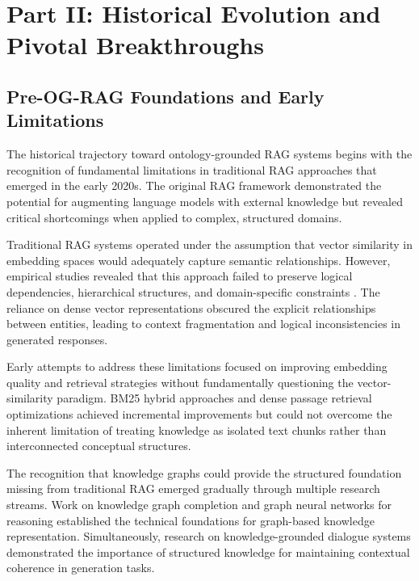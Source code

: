 \section{Part II: Historical Evolution and Pivotal Breakthroughs}

\subsection{Pre-OG-RAG Foundations and Early Limitations}

The historical trajectory toward ontology-grounded RAG systems begins with the recognition of fundamental limitations in traditional RAG approaches that emerged in the early 2020s. The original RAG framework \cite{lewis2020retrieval} demonstrated the potential for augmenting language models with external knowledge but revealed critical shortcomings when applied to complex, structured domains.

Traditional RAG systems operated under the assumption that vector similarity in embedding spaces would adequately capture semantic relationships. However, empirical studies revealed that this approach failed to preserve logical dependencies, hierarchical structures, and domain-specific constraints \cite{petroni2021kilt}. The reliance on dense vector representations obscured the explicit relationships between entities, leading to context fragmentation and logical inconsistencies in generated responses.

Early attempts to address these limitations focused on improving embedding quality and retrieval strategies without fundamentally questioning the vector-similarity paradigm. BM25 hybrid approaches \cite{karpukhin2020dense} and dense passage retrieval optimizations \cite{qu2021rocketqa} achieved incremental improvements but could not overcome the inherent limitation of treating knowledge as isolated text chunks rather than interconnected conceptual structures.

The recognition that knowledge graphs could provide the structured foundation missing from traditional RAG emerged gradually through multiple research streams. Work on knowledge graph completion \cite{sun2019rotate} and graph neural networks for reasoning \cite{hamilton2017inductive} established the technical foundations for graph-based knowledge representation. Simultaneously, research on knowledge-grounded dialogue systems \cite{moon2019opendialkg} demonstrated the importance of structured knowledge for maintaining contextual coherence in generation tasks.

